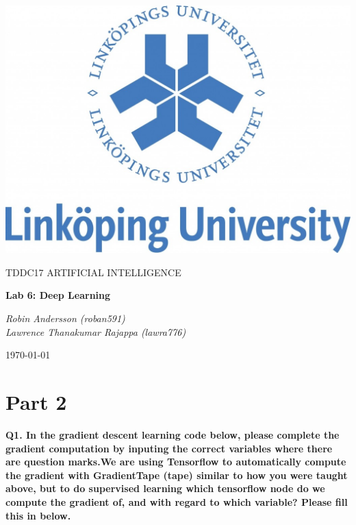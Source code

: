\documentclass[a4paper,10pt]{article}
\begin{document}
\begin{titlepage}
	\centering
	\includegraphics[width=.6\textwidth]{liu-logo.png}\par
	\vfill
	{\scshape\Large TDDC17 ARTIFICIAL INTELLIGENCE\par}
	{\huge\bfseries Lab 6: Deep Learning\par}
	\vspace{1cm}
	{\large\itshape Robin Andersson (roban591) \\ Lawrence Thanakumar Rajappa (lawra776)\par}
	\vfill
	{\large \today\par}
\end{titlepage}



\section*{Part 2}
\textbf{Q1. In the gradient descent learning code below, please complete the gradient computation by inputing the
correct variables where there are question marks.We are using Tensorflow to automatically compute the gradient with
GradientTape (tape) similar to how you were taught above, but to do supervised learning which tensorflow node do
we compute the gradient of, and with regard to which variable? Please fill this in below.}
\end{document}
